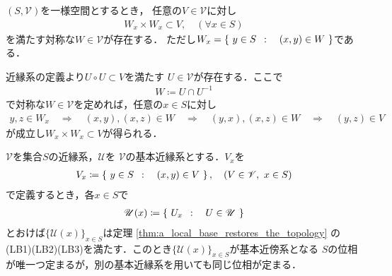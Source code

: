 	\begin{screen}
		\begin{thm}\label{thm:uniform_structure}
			$(S,\mathscr{V})$を一様空間とするとき，
			任意の$V \in \mathscr{V}$に対し
			\begin{align}
				W_x \times W_x \subset V,\quad (\forall x \in S)
			\end{align}
			を満たす対称な$W \in \mathscr{V}$が存在する．
			ただし$W_x = \left\{\ y \in S\ \, : \quad (x,y) \in W\ \right\}$である．
		\end{thm}
	\end{screen}
	
	\begin{prf}
		近縁系の定義より$U \circ U \subset V$を満たす
		$U \in \mathscr{V}$が存在する．ここで
		\begin{align}
			W \coloneqq U \cap U^{-1}
		\end{align}
		で対称な$W \in \mathscr{V}$を定めれば，任意の$x \in S$に対し
		\begin{align}
			y,z \in W_x \quad \Longrightarrow \quad
			(x,y),(x,z) \in W \quad \Longrightarrow \quad
			(y,x),(x,z) \in W \quad \Longrightarrow \quad
			(y,z) \in V
		\end{align}
		が成立し$W_x \times W_x \subset V$が得られる．
		\QED
	\end{prf}
	
	\begin{screen}
		\begin{thm}[近縁系で導入する位相]\label{thm:topology_induced_by_the_uniformity}
			$\mathscr{V}$を集合$S$の近縁系，$\mathscr{U}$を
			$\mathscr{V}$の基本近縁系とする．$V_x$を
			\begin{align}
				V_x \coloneqq \left\{\ y \in S\ \, : \quad (x,y) \in V\ \right\},
				\quad (V \in \mathscr{V},\ x \in S)
			\end{align}
			で定義するとき，各$x \in S$で
			\begin{align}
				\mathscr{U}(x) \coloneqq \left\{\ U_x\ \, : \quad U \in \mathscr{U}\ \right\}
			\end{align}
			とおけば$\{\mathscr{U}(x)\}_{x \in S}$は定理
			\ref{thm:a_local_base_restores_the_topology}
			の(LB1)(LB2)(LB3)を満たす．このとき$\{\mathscr{U}(x)\}_{x \in S}$が基本近傍系となる
			$S$の位相が唯一つ定まるが，別の基本近縁系を用いても同じ位相が定まる．
		\end{thm}
	\end{screen}
	
